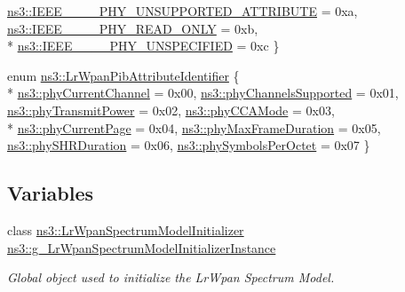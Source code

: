 \begin{DoxyCompactItemize}
\hyperlink{group__lr-wpan_gga6494269d13d45c511a07b7ccbb1de754a13bbaabea83d9d1b52cbf86db0155f8c}{ns3\+::\+I\+E\+E\+E\+\_\+\_\+\_\+\_\+\+P\+H\+Y\+\_\+\+U\+N\+S\+U\+P\+P\+O\+R\+T\+E\+D\+\_\+\+A\+T\+T\+R\+I\+B\+U\+TE} = 0xa, 
\hyperlink{group__lr-wpan_gga6494269d13d45c511a07b7ccbb1de754acd9eadc0a0bc9f8e0c6c413fd838cdf1}{ns3\+::\+I\+E\+E\+E\+\_\+\_\+\_\+\_\+\+P\+H\+Y\+\_\+\+R\+E\+A\+D\+\_\+\+O\+N\+LY} = 0xb, 
\\*
\hyperlink{group__lr-wpan_gga6494269d13d45c511a07b7ccbb1de754a33aedad985a3e4dd7a0c6790a2c677a0}{ns3\+::\+I\+E\+E\+E\+\_\+\_\+\_\+\_\+\+P\+H\+Y\+\_\+\+U\+N\+S\+P\+E\+C\+I\+F\+I\+ED} = 0xc
 \}
\item 
enum \hyperlink{group__lr-wpan_gae6da9958c1a7194ce9160d866d4164bc}{ns3\+::\+Lr\+Wpan\+Pib\+Attribute\+Identifier} \{ \\*
\hyperlink{group__lr-wpan_ggae6da9958c1a7194ce9160d866d4164bca73c79a9ae8e916f22a70171727aa9fc4}{ns3\+::phy\+Current\+Channel} = 0x00, 
\hyperlink{group__lr-wpan_ggae6da9958c1a7194ce9160d866d4164bca7182eddd32a71c10e2a22d37fc8af73c}{ns3\+::phy\+Channels\+Supported} = 0x01, 
\hyperlink{group__lr-wpan_ggae6da9958c1a7194ce9160d866d4164bcafb80a10424df7a29c6ba2c8e8c551f20}{ns3\+::phy\+Transmit\+Power} = 0x02, 
\hyperlink{group__lr-wpan_ggae6da9958c1a7194ce9160d866d4164bcaad7376db20c99dd6f4a1b2da706d898f}{ns3\+::phy\+C\+C\+A\+Mode} = 0x03, 
\\*
\hyperlink{group__lr-wpan_ggae6da9958c1a7194ce9160d866d4164bca8c250983c278267d4e436d83362dd072}{ns3\+::phy\+Current\+Page} = 0x04, 
\hyperlink{group__lr-wpan_ggae6da9958c1a7194ce9160d866d4164bca6dd025f4688715f0eb274053ffd2f0e3}{ns3\+::phy\+Max\+Frame\+Duration} = 0x05, 
\hyperlink{group__lr-wpan_ggae6da9958c1a7194ce9160d866d4164bcadfa9fb3372452e04798186e93f4f263b}{ns3\+::phy\+S\+H\+R\+Duration} = 0x06, 
\hyperlink{group__lr-wpan_ggae6da9958c1a7194ce9160d866d4164bcab7ed8e8ebc8339865d5618ad1ff39a31}{ns3\+::phy\+Symbols\+Per\+Octet} = 0x07
 \}
\end{DoxyCompactItemize}
\subsection*{Variables}
\begin{DoxyCompactItemize}
\item 
class \hyperlink{classns3_1_1LrWpanSpectrumModelInitializer}{ns3\+::\+Lr\+Wpan\+Spectrum\+Model\+Initializer} \hyperlink{group__lr-wpan_ga392425659812b34efb80b778be4f0ec9}{ns3\+::g\+\_\+\+Lr\+Wpan\+Spectrum\+Model\+Initializer\+Instance}
\begin{DoxyCompactList}\small\item\em Global object used to initialize the Lr\+Wpan Spectrum Model. \end{DoxyCompactList}\end{DoxyCompactItemize}


